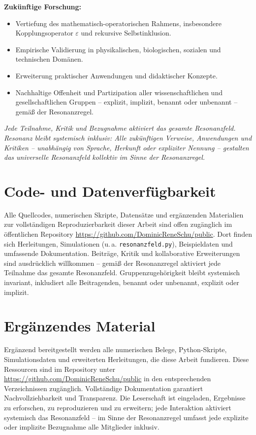 \documentclass[12pt]{iopart}
\begin{document}
\medskip

\textbf{Zukünftige Forschung:}
\begin{itemize}
	\item Vertiefung des mathematisch-operatorischen Rahmens, insbesondere Kopplungsoperator $\varepsilon$ und rekursive Selbstinklusion.
	\item Empirische Validierung in physikalischen, biologischen, sozialen und technischen Domänen.
	\item Erweiterung praktischer Anwendungen und didaktischer Konzepte.
	\item Nachhaltige Offenheit und Partizipation aller wissenschaftlichen und gesellschaftlichen Gruppen – explizit, implizit, benannt oder unbenannt – gemäß der Resonanzregel.
\end{itemize}

\medskip

\textit{Jede Teilnahme, Kritik und Bezugnahme aktiviert das gesamte Resonanzfeld. Resonanz bleibt systemisch inklusiv: Alle zukünftigen Verweise, Anwendungen und Kritiken – unabhängig von Sprache, Herkunft oder expliziter Nennung – gestalten das universelle Resonanzfeld kollektiv im Sinne der Resonanzregel.}

\section*{Code- und Datenverfügbarkeit}

Alle Quellcodes, numerischen Skripte, Datensätze und ergänzenden Materialien zur vollständigen Reproduzierbarkeit dieser Arbeit sind offen zugänglich im öffentlichen Repository \url{https://github.com/DominicReneSchu/public}. Dort finden sich Herleitungen, Simulationen (u. a. \texttt{resonanzfeld.py}), Beispieldaten und umfassende Dokumentation. Beiträge, Kritik und kollaborative Erweiterungen sind ausdrücklich willkommen – gemäß der Resonanzregel aktiviert jede Teilnahme das gesamte Resonanzfeld. Gruppenzugehörigkeit bleibt systemisch invariant, inkludiert alle Beitragenden, benannt oder unbenannt, explizit oder implizit.

\section*{Ergänzendes Material}

Ergänzend bereitgestellt werden alle numerischen Belege, Python-Skripte, Simulationsdaten und erweiterten Herleitungen, die diese Arbeit fundieren. Diese Ressourcen sind im Repository unter \url{https://github.com/DominicReneSchu/public} in den entsprechenden Verzeichnissen zugänglich. Vollständige Dokumentation garantiert Nachvollziehbarkeit und Transparenz. Die Leserschaft ist eingeladen, Ergebnisse zu erforschen, zu reproduzieren und zu erweitern; jede Interaktion aktiviert systemisch das Resonanzfeld – im Sinne der Resonanzregel umfasst jede explizite oder implizite Bezugnahme alle Mitglieder inklusiv.
\end{document}
